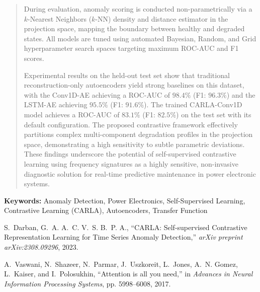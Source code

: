 \documentclass[11pt,a4paper]{article}
\begin{document}
\begin{abstract}
During evaluation, anomaly scoring is conducted non-parametrically via a $k$-Nearest Neighbors ($k$-NN) density and distance estimator in the projection space, mapping the boundary between healthy and degraded states. All models are tuned using automated Bayesian, Random, and Grid hyperparameter search spaces targeting maximum ROC-AUC and F1 scores. 

Experimental results on the held-out test set show that traditional reconstruction-only autoencoders yield strong baselines on this dataset, with the Conv1D-AE achieving a ROC-AUC of $98.4\%$ (F1: $96.3\%$) and the LSTM-AE achieving $95.5\%$ (F1: $91.6\%$). The trained CARLA-Conv1D model achieves a ROC-AUC of $83.1\%$ (F1: $82.5\%$) on the test set with its default configuration. The proposed contrastive framework effectively partitions complex multi-component degradation profiles in the projection space, demonstrating a high sensitivity to subtle parametric deviations. These findings underscore the potential of self-supervised contrastive learning using frequency signatures as a highly sensitive, non-invasive diagnostic solution for real-time predictive maintenance in power electronic systems.
\end{abstract}

\vspace{0.5cm}
\noindent \textbf{Keywords:} Anomaly Detection, Power Electronics, Self-Supervised Learning, Contrastive Learning (CARLA), Autoencoders, Transfer Function


\begin{thebibliography}{1}

S.~Darban, G.~A. A.~C. V.~S. B.~P. A., ``CARLA: Self-supervised Contrastive Representation Learning for Time Series Anomaly Detection,'' \emph{arXiv preprint arXiv:2308.09296}, 2023.

A.~Vaswani, N.~Shazeer, N.~Parmar, J.~Uszkoreit, L.~Jones, A.~N. Gomez, L.~Kaiser, and I.~Polosukhin, ``Attention is all you need,'' in \emph{Advances in Neural Information Processing Systems}, pp. 5998--6008, 2017.

\end{thebibliography}
\end{document}

